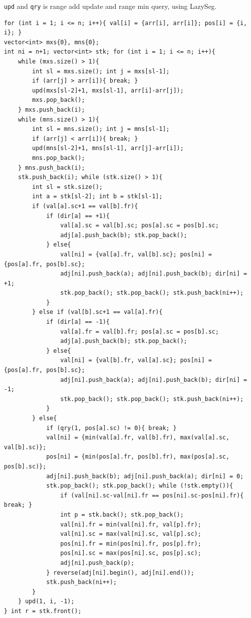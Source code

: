 \texttt{upd} and \texttt{qry} is range add update and range min query, using LazySeg.
\begin{verbatim}
for (int i = 1; i <= n; i++){ val[i] = {arr[i], arr[i]}; pos[i] = {i, i}; }
vector<int> mxs{0}, mns{0};
int ni = n+1; vector<int> stk; for (int i = 1; i <= n; i++){
	while (mxs.size() > 1){
		int sl = mxs.size(); int j = mxs[sl-1];
		if (arr[j] > arr[i]){ break; }
		upd(mxs[sl-2]+1, mxs[sl-1], arr[i]-arr[j]);
		mxs.pop_back();
	} mxs.push_back(i);
	while (mns.size() > 1){
		int sl = mns.size(); int j = mns[sl-1];
		if (arr[j] < arr[i]){ break; }
		upd(mns[sl-2]+1, mns[sl-1], arr[j]-arr[i]);
		mns.pop_back();
	} mns.push_back(i);
	stk.push_back(i); while (stk.size() > 1){
		int sl = stk.size();
		int a = stk[sl-2]; int b = stk[sl-1];
		if (val[a].sc+1 == val[b].fr){
			if (dir[a] == +1){
				val[a].sc = val[b].sc; pos[a].sc = pos[b].sc;
				adj[a].push_back(b); stk.pop_back();
			} else{
				val[ni] = {val[a].fr, val[b].sc}; pos[ni] = {pos[a].fr, pos[b].sc};
				adj[ni].push_back(a); adj[ni].push_back(b); dir[ni] = +1;
				stk.pop_back(); stk.pop_back(); stk.push_back(ni++);
			}
		} else if (val[b].sc+1 == val[a].fr){
			if (dir[a] == -1){
				val[a].fr = val[b].fr; pos[a].sc = pos[b].sc;
				adj[a].push_back(b); stk.pop_back();
			} else{
				val[ni] = {val[b].fr, val[a].sc}; pos[ni] = {pos[a].fr, pos[b].sc};
				adj[ni].push_back(a); adj[ni].push_back(b); dir[ni] = -1;
				stk.pop_back(); stk.pop_back(); stk.push_back(ni++);
			}
		} else{
			if (qry(1, pos[a].sc) != 0){ break; }
			val[ni] = {min(val[a].fr, val[b].fr), max(val[a].sc, val[b].sc)};
			pos[ni] = {min(pos[a].fr, pos[b].fr), max(pos[a].sc, pos[b].sc)};
			adj[ni].push_back(b); adj[ni].push_back(a); dir[ni] = 0;
			stk.pop_back(); stk.pop_back(); while (!stk.empty()){
				if (val[ni].sc-val[ni].fr == pos[ni].sc-pos[ni].fr){ break; }
				int p = stk.back(); stk.pop_back();
				val[ni].fr = min(val[ni].fr, val[p].fr);
				val[ni].sc = max(val[ni].sc, val[p].sc);
				pos[ni].fr = min(pos[ni].fr, pos[p].fr);
				pos[ni].sc = max(pos[ni].sc, pos[p].sc);
				adj[ni].push_back(p);
			} reverse(adj[ni].begin(), adj[ni].end());
			stk.push_back(ni++);
		}
	} upd(1, i, -1);
} int r = stk.front();
\end{verbatim}